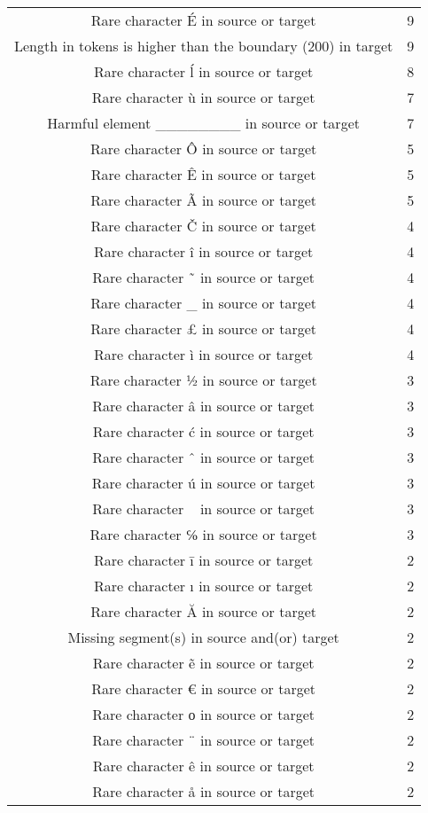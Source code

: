\begin{longtable}{cc}
Rare character É in source or target & 9 \\
Length in tokens is higher than the boundary (200) in target & 9 \\
Rare character ĺ in source or target & 8 \\
Rare character ù in source or target & 7 \\
Harmful element \_\_\_\_\_\_\_\_ in source or target & 7 \\
Rare character Ô in source or target & 5 \\
Rare character Ê in source or target & 5 \\
Rare character Ã in source or target & 5 \\
Rare character Č in source or target & 4 \\
Rare character î in source or target & 4 \\
Rare character ˜ in source or target & 4 \\
Rare character \_ in source or target & 4 \\
Rare character £ in source or target & 4 \\
Rare character ì in source or target & 4 \\
Rare character ½ in source or target & 3 \\
Rare character â in source or target & 3 \\ 
Rare character ć in source or target & 3 \\
Rare character ˆ in source or target & 3 \\
Rare character ú in source or target & 3 \\
Rare character ~ in source or target & 3 \\
Rare character ℅ in source or target & 3 \\
Rare character ī in source or target & 2 \\
Rare character ı in source or target & 2 \\
Rare character Ă in source or target & 2 \\
Missing segment(s) in source and(or) target & 2 \\
Rare character ẽ in source or target & 2 \\
Rare character € in source or target & 2 \\
Rare character о in source or target & 2 \\
Rare character ¨ in source or target & 2 \\
Rare character ê in source or target & 2 \\
Rare character å in source or target & 2 \\

\end{longtable}
